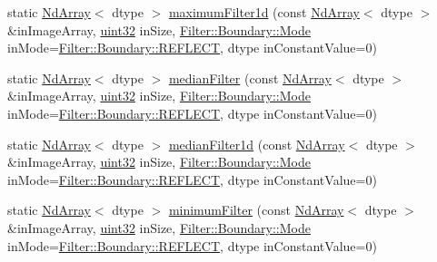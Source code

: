 \begin{DoxyCompactItemize}
\item 
static \mbox{\hyperlink{class_num_c_1_1_nd_array}{Nd\+Array}}$<$ dtype $>$ \mbox{\hyperlink{class_num_c_1_1_filters_aaead5029a360f207f497a90304ce21ac}{maximum\+Filter1d}} (const \mbox{\hyperlink{class_num_c_1_1_nd_array}{Nd\+Array}}$<$ dtype $>$ \&in\+Image\+Array, \mbox{\hyperlink{namespace_num_c_ae685802ca6d3035f2b400b081e3953fa}{uint32}} in\+Size, \mbox{\hyperlink{struct_num_c_1_1_filter_1_1_boundary_a20ccfbf059139a99eda623c1550a27e3}{Filter\+::\+Boundary\+::\+Mode}} in\+Mode=\mbox{\hyperlink{struct_num_c_1_1_filter_1_1_boundary_a20ccfbf059139a99eda623c1550a27e3a5571d98046aa858b5c79dce8c4c16c04}{Filter\+::\+Boundary\+::\+R\+E\+F\+L\+E\+CT}}, dtype in\+Constant\+Value=0)
\item 
static \mbox{\hyperlink{class_num_c_1_1_nd_array}{Nd\+Array}}$<$ dtype $>$ \mbox{\hyperlink{class_num_c_1_1_filters_a87cbfb7cddb015f8e47cdd8a7eb45c3d}{median\+Filter}} (const \mbox{\hyperlink{class_num_c_1_1_nd_array}{Nd\+Array}}$<$ dtype $>$ \&in\+Image\+Array, \mbox{\hyperlink{namespace_num_c_ae685802ca6d3035f2b400b081e3953fa}{uint32}} in\+Size, \mbox{\hyperlink{struct_num_c_1_1_filter_1_1_boundary_a20ccfbf059139a99eda623c1550a27e3}{Filter\+::\+Boundary\+::\+Mode}} in\+Mode=\mbox{\hyperlink{struct_num_c_1_1_filter_1_1_boundary_a20ccfbf059139a99eda623c1550a27e3a5571d98046aa858b5c79dce8c4c16c04}{Filter\+::\+Boundary\+::\+R\+E\+F\+L\+E\+CT}}, dtype in\+Constant\+Value=0)
\item 
static \mbox{\hyperlink{class_num_c_1_1_nd_array}{Nd\+Array}}$<$ dtype $>$ \mbox{\hyperlink{class_num_c_1_1_filters_a358311eaadb1a44e94e8e30af2328222}{median\+Filter1d}} (const \mbox{\hyperlink{class_num_c_1_1_nd_array}{Nd\+Array}}$<$ dtype $>$ \&in\+Image\+Array, \mbox{\hyperlink{namespace_num_c_ae685802ca6d3035f2b400b081e3953fa}{uint32}} in\+Size, \mbox{\hyperlink{struct_num_c_1_1_filter_1_1_boundary_a20ccfbf059139a99eda623c1550a27e3}{Filter\+::\+Boundary\+::\+Mode}} in\+Mode=\mbox{\hyperlink{struct_num_c_1_1_filter_1_1_boundary_a20ccfbf059139a99eda623c1550a27e3a5571d98046aa858b5c79dce8c4c16c04}{Filter\+::\+Boundary\+::\+R\+E\+F\+L\+E\+CT}}, dtype in\+Constant\+Value=0)
\item 
static \mbox{\hyperlink{class_num_c_1_1_nd_array}{Nd\+Array}}$<$ dtype $>$ \mbox{\hyperlink{class_num_c_1_1_filters_af827f96d4d86cb2f0a43c743bccee74f}{minimum\+Filter}} (const \mbox{\hyperlink{class_num_c_1_1_nd_array}{Nd\+Array}}$<$ dtype $>$ \&in\+Image\+Array, \mbox{\hyperlink{namespace_num_c_ae685802ca6d3035f2b400b081e3953fa}{uint32}} in\+Size, \mbox{\hyperlink{struct_num_c_1_1_filter_1_1_boundary_a20ccfbf059139a99eda623c1550a27e3}{Filter\+::\+Boundary\+::\+Mode}} in\+Mode=\mbox{\hyperlink{struct_num_c_1_1_filter_1_1_boundary_a20ccfbf059139a99eda623c1550a27e3a5571d98046aa858b5c79dce8c4c16c04}{Filter\+::\+Boundary\+::\+R\+E\+F\+L\+E\+CT}}, dtype in\+Constant\+Value=0)

\end{DoxyCompactItemize}
